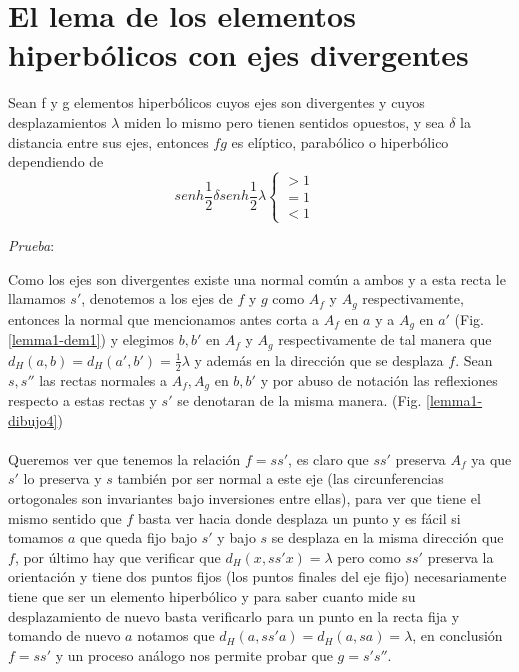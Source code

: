 


\section{El lema de los elementos hiperb\'olicos con ejes divergentes}

\begin{lem} \label{lema1}
Sean f y g elementos hiperb\'olicos cuyos ejes son divergentes y
cuyos desplazamientos $\lambda$ miden lo mismo pero tienen sentidos
opuestos, y sea $\delta$ la distancia entre sus ejes, entonces $fg$
es el\'iptico, parab\'olico o hiperb\'olico dependiendo de
$$senh \frac{1}{2} \delta senh \frac{1}{2} \lambda    \left \{ \begin{matrix} > 1 & \mbox{ }\mbox{ }
\\ =1 & \mbox{ }\mbox{ } \\ <1 \mbox{} {}\end{matrix}\right. $$
\end{lem}

\textit{Prueba}:

Como los ejes son divergentes existe una normal com\'un a ambos y a
esta recta le llamamos $s'$, denotemos a los ejes de $f$ y $g$ como
$A_{f}$ y $A_{g}$ respectivamente, entonces la normal que
mencionamos antes corta a $A_{f}$ en $a$ y a $A_{g}$ en $a'$ (Fig. \ref{lemma1-dem1}) y
elegimos $b,b'$ en $A_{f}$ y $A_{g}$ respectivamente  de tal manera
que $d_{H}(a,b)=d_{H}(a',b')= \frac{1}{2} \lambda$ y adem\'as en la
direcci\'on que se desplaza $f$. Sean $s,s''$ las rectas normales a
$A_{f},A_{g}$ en $b, b'$ y por abuso de notaci\'on las reflexiones
respecto a estas rectas y $s'$ se denotaran de la misma manera. (Fig. \ref{lemma1-dibujo4}) \\ \\

Queremos ver que tenemos la relaci\'on $f=ss'$, es claro que $ss'$
preserva $A_{f}$ ya que $s'$ lo preserva y $s$ tambi\'en por ser
normal a este eje (las circunferencias ortogonales son invariantes bajo inversiones
entre  ellas), para ver que tiene el mismo sentido que $f$
basta ver hacia donde desplaza un punto y es f\'acil si tomamos $a$ que
queda fijo bajo $s'$ y bajo $s$ se desplaza en la misma direcci\'on
que $f$, por \'ultimo hay que verificar que $d_{H}(x,ss'x) = \lambda
$ pero como $ss'$ preserva la orientaci\'on y tiene dos puntos fijos
(los puntos finales del eje fijo) necesariamente tiene que ser un
elemento hiperb\'olico y para saber cuanto mide su desplazamiento de
nuevo basta verificarlo para un punto en la recta fija y tomando 
de nuevo $a$ notamos que $d_{H}(a,ss'a)= d_{H}(a,sa)= \lambda$, en
conclusi\'on $f=ss'$ y un proceso an\'alogo nos permite probar que
$g=s's''$. \\


